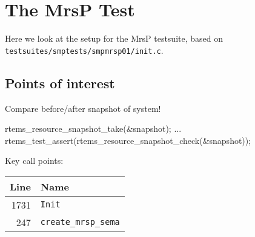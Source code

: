 \section{The MrsP Test}\label{sec:MrsPTest}

Here we look at the setup for the MrsP testsuite,
based on \verb"testsuites/smptests/smpmrsp01/init.c".



\subsection{Points of interest}

Compare before/after snapshot of system!
\begin{nicec}
rtems_resource_snapshot_take(&snapshot);
...
rtems_test_assert(rtems_resource_snapshot_check(&snapshot));
\end{nicec}


Key call points:

\begin{tabular}{|r|l|}
  \hline
    Line & Name
\\\hline
    1731 & \verb"Init"
\\\hline
    247 & \verb"create_mrsp_sema"
\\\hline
\end{tabular}
